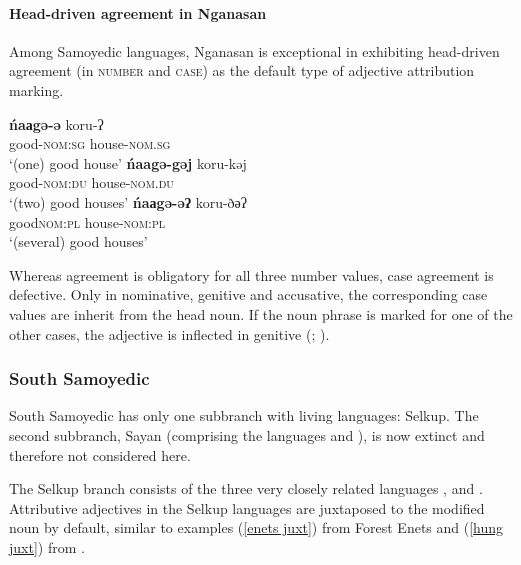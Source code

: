 \paragraph*{Head-driven agreement in Nganasan}
Among Samoyedic languages, Nganasan is exceptional in exhibiting head\hyp{}driven agreement (in \textsc{number} and \textsc{case}) as the default type of adjective attribution marking. 
\begin{exe}
\begin{xlist}
\ex 
\gll	\textbf{ńaаgə-ə}		koru-ʔ\\
	good\textsc{-nom:sg}	house\textsc{-nom.sg}\\
\glt	‘(one) good house’
\ex
\gll	\textbf{ńaagə-gəj}		koru-kəj\\
	good\textsc{-nom:du}	house\textsc{-nom.du}\\
\glt	‘(two) good houses’
\ex
\gll	\textbf{ńaаgə-əʔ}		koru-ðәʔ\\
	good\textsc{nom:pl}		house\textsc{-nom:pl}\\
\glt	‘(several) good houses’
\end{xlist}
\end{exe}
Whereas agreement is obligatory for all three number values, case agreement is defective. Only in nominative, genitive and accusative, the corresponding case values are inherit from the head noun. If the noun phrase is marked for one of the other cases, the adjective is inflected in genitive (\citealt[511]{helimski1998a}; \citealt[157]{wagner-nagy2002a}).

\subsubsection{South Samoyedic}
South Samoyedic has only one subbranch with living languages: Selkup. The second subbranch, Sayan (comprising the languages  and ), is now extinct \citep[231]{salminen2007} and therefore not considered here.

The Selkup branch consists of the three very closely related languages ,  and . Attributive adjectives in the Selkup languages are juxtaposed to the modified noun by default, similar to examples (\ref{enets juxt}) from Forest Enets and (\ref{hung juxt}) from .

